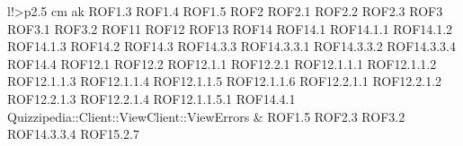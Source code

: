 \begin{tabella}{l!{\VRule}>{\centering\arraybackslash}p{2.5 cm}}
ak ROF1.3 \linebreak ROF1.4 \linebreak ROF1.5 \linebreak ROF2 \linebreak ROF2.1 \linebreak ROF2.2 \linebreak ROF2.3 \linebreak ROF3 \linebreak ROF3.1 \linebreak ROF3.2 \linebreak ROF11 \linebreak ROF12 \linebreak ROF13 \linebreak ROF14 \linebreak ROF14.1 \linebreak ROF14.1.1 \linebreak ROF14.1.2 \linebreak ROF14.1.3 \linebreak ROF14.2 \linebreak ROF14.3 \linebreak ROF14.3.3 \linebreak ROF14.3.3.1 \linebreak ROF14.3.3.2 \linebreak ROF14.3.3.4 \linebreak ROF14.4 \linebreak ROF12.1 \linebreak ROF12.2 \linebreak ROF12.1.1 \linebreak ROF12.2.1 \linebreak ROF12.1.1.1 \linebreak ROF12.1.1.2 \linebreak ROF12.1.1.3 \linebreak ROF12.1.1.4 \linebreak ROF12.1.1.5 \linebreak ROF12.1.1.6 \linebreak ROF12.2.1.1 \linebreak ROF12.2.1.2 \linebreak ROF12.2.1.3 \linebreak ROF12.2.1.4 \linebreak ROF12.1.1.5.1 \linebreak ROF14.4.1 \\
Quizzipedia::Client::ViewClient::ViewErrors & ROF1.5 \linebreak ROF2.3 \linebreak ROF3.2 \linebreak ROF14.3.3.4 \linebreak ROF15.2.7 \\

\end{tabella}
